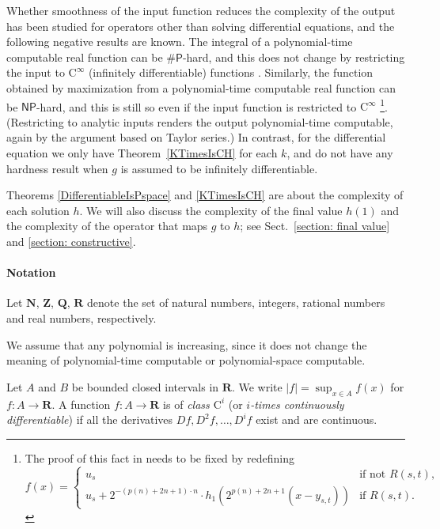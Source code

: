 \documentclass{lmcs}
\theoremstyle{definition}
\theoremstyle{remark}
\newcommand{\R}{\mathbf R}
\newcommand{\N}{\mathbf N}
\newcommand{\Q}{\mathbf Q}
\newcommand{\Z}{\mathbf Z}
\newcommand{\D}{D}
\newcommand{\classNP}{\mathsf{NP}}
\newcommand{\classNumberP}{\mathsf{\#P}}
\newcommand{\classC}{\mathrm C}
\begin{document}
Whether smoothness of the input function 
reduces the complexity of the output
has been studied for operators other than solving differential equations, 
and the following negative results are known. 
The integral of a polynomial-time computable real function 
can be $\classNumberP$-hard, and this does not change 
by restricting the input to 
$\classC ^\infty$ (infinitely differentiable) functions
\cite[Theorem~5.33]{ko1991complexity}. 
Similarly, the function obtained by maximization 
from a polynomial-time computable real function 
can be $\classNP$-hard, and this is still so
even if the input function is restricted to $\classC ^\infty$ 
\cite[Theorem~3.7]{ko1991complexity}%
\footnote{%
The proof of this fact in \cite[Theorem 3.7]{ko1991complexity}
needs to be fixed by redefining 
\[f(x) = 
\begin{cases}
 u_s & \text{if not } R(s,t), \\
 u_s + 2^{-(p(n)+2n+1)\cdot n} \cdot h_1(2^{p(n)+2n+1} (x - y_{s,t})) & \text{if } R(s,t). 
\end{cases}\]
}. 
(Restricting to analytic inputs 
renders the output polynomial-time computable, 
again by the argument based on Taylor series.)
In contrast, for the differential equation
we only have Theorem~\ref{KTimesIsCH} for each $k$, 
and do not have any hardness result 
when $g$ is assumed to be infinitely differentiable. 

Theorems \ref{DifferentiableIsPspace} and \ref{KTimesIsCH} 
are about the complexity of each solution $h$. 
We will also discuss
the complexity of the final value $h(1)$ and
the complexity of the operator that maps $g$ to $h$; 
see Sect.~\ref{section: final value} and \ref{section: constructive}. 

\paragraph{Notation}
Let $\N$, $\Z$, $\Q$, $\R$ denote the set of natural numbers,
integers,
rational numbers and 
real numbers, respectively.

We assume that any polynomial is increasing,
since it does not change the meaning of 
polynomial-time computable or polynomial-space computable.

Let $A$ and $B$ be bounded closed intervals in $\R$.
We write $|f| = \sup_{x \in A} f(x)$ for $f \colon A \to \R$.
A function $f \colon A \to \R$ is of \emph{class $\classC^i$}
(or \emph{$i$-times continuously differentiable})
if all the derivatives $\D f, \D^2 f, \dots, \D^i f$ exist and are continuous.
\end{document}
